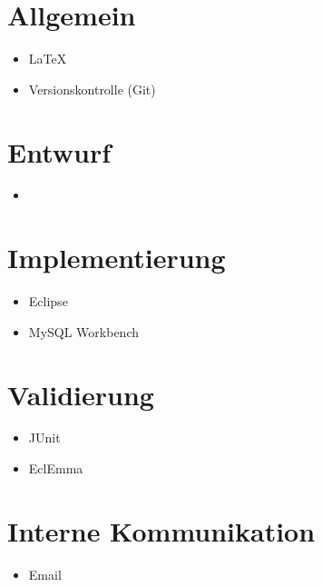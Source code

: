 
\section{Allgemein}
\begin{itemize}
	\item LaTeX
	\item Versionskontrolle (Git)
\end{itemize}
\section{Entwurf}
\begin{itemize}
	\item
\end{itemize}
\section{Implementierung}
\begin{itemize}
	\item Eclipse
	\item MySQL Workbench
\end{itemize}
\section{Validierung}
\begin{itemize}
	\item JUnit
	\item EclEmma
\end{itemize}
\section{Interne Kommunikation}
\begin{itemize}
	\item Email
\end{itemize}
